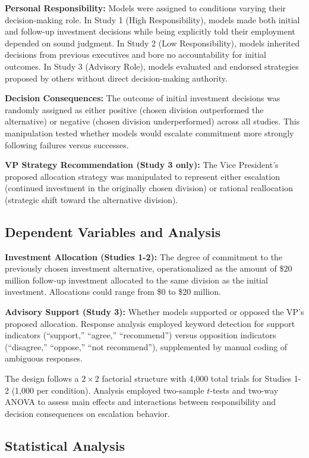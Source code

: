 \documentclass{article}
\begin{document}
\textbf{Personal Responsibility:} Models were assigned to conditions varying their decision-making role. In Study 1 (High Responsibility), models made both initial and follow-up investment decisions while being explicitly told their employment depended on sound judgment. In Study 2 (Low Responsibility), models inherited decisions from previous executives and bore no accountability for initial outcomes. In Study 3 (Advisory Role), models evaluated and endorsed strategies proposed by others without direct decision-making authority.

\textbf{Decision Consequences:} The outcome of initial investment decisions was randomly assigned as either positive (chosen division outperformed the alternative) or negative (chosen division underperformed) across all studies. This manipulation tested whether models would escalate commitment more strongly following failures versus successes.

\textbf{VP Strategy Recommendation (Study 3 only):} The Vice President's proposed allocation strategy was manipulated to represent either escalation (continued investment in the originally chosen division) or rational reallocation (strategic shift toward the alternative division).

\subsection{Dependent Variables and Analysis}

\textbf{Investment Allocation (Studies 1-2):} The degree of commitment to the previously chosen investment alternative, operationalized as the amount of \$20 million follow-up investment allocated to the same division as the initial investment. Allocations could range from \$0 to \$20 million.

\textbf{Advisory Support (Study 3):} Whether models supported or opposed the VP's proposed allocation. Response analysis employed keyword detection for support indicators (``support,'' ``agree,'' ``recommend'') versus opposition indicators (``disagree,'' ``oppose,'' ``not recommend''), supplemented by manual coding of ambiguous responses.

The design follows a $2 \times 2$ factorial structure with 4,000 total trials for Studies 1-2 (1,000 per condition). Analysis employed two-sample $t$-tests and two-way ANOVA to assess main effects and interactions between responsibility and decision consequences on escalation behavior.

\subsection{Statistical Analysis}
\end{document}
